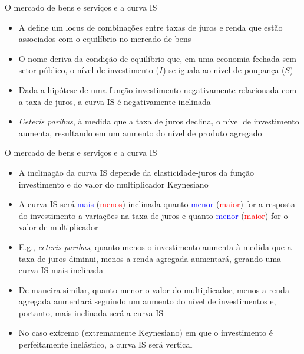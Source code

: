 \documentclass[10pt]{beamer}
\begin{document}
\begin{frame}{O mercado de bens e serviços e a curva IS}
    \begin{itemize}
        \item A  define um locus de combinações entre taxas de juros e renda que estão associados com o equilíbrio no mercado de bens
        \bigskip
        \item O nome deriva da condição de equilíbrio que, em uma economia fechada sem setor público, o nível de investimento ($I$) se iguala ao nível de poupança ($S$)
        \bigskip
        \item Dada a hipótese de uma função investimento negativamente relacionada com a taxa de juros, a curva IS é negativamente inclinada
        \bigskip
        \item \emph{Ceteris paribus}, à medida que a taxa de juros declina, o nível de investimento aumenta, resultando em um aumento do nível de produto agregado
    \end{itemize}
\end{frame}

\begin{frame}{O mercado de bens e serviços e a curva IS}
    \begin{itemize}
        \item A inclinação da curva IS depende da elasticidade-juros da função investimento e do valor do multiplicador Keynesiano
        \bigskip
        \item A curva IS será \textcolor{blue}{mais} (\textcolor{red}{menos}) inclinada quanto \textcolor{blue}{menor} (\textcolor{red}{maior}) for a resposta do investimento a variações na taxa de juros e quanto \textcolor{blue}{menor} (\textcolor{red}{maior}) for o valor de multiplicador
        \bigskip
        \item E.g., \emph{ceteris paribus}, quanto menos o investimento aumenta à medida que a taxa de juros diminui, menos a renda agregada aumentará, gerando uma curva IS mais inclinada
        \bigskip
        \item De maneira similar, quanto menor o valor do multiplicador, menos a renda agregada aumentará seguindo um aumento do nível de investimentos e, portanto, mais inclinada será a curva IS
        \bigskip
        \item No caso extremo (extremamente Keynesiano) em que o investimento é perfeitamente inelástico, a curva IS será vertical
    \end{itemize}
\end{frame}
\end{document}
